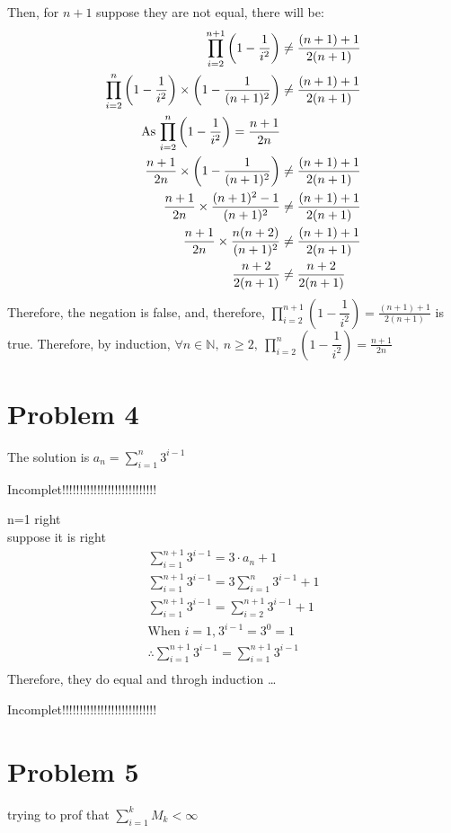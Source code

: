 \documentclass{article}
\begin{document}
    Then, for \(n+1\) suppose they are not equal, there will be:
    \begin{align*}
        \prod ^{n+1}_{i=2}\left(1-\dfrac{1}{i^2}\right)&\neq \frac{(n+1)+1}{2(n+1)}\\
        \prod ^{n}_{i=2}\left(1-\dfrac{1}{i^2}\right)\times \left(1-\frac{1}{(n+1)^2}\right)&\neq \frac{(n+1)+1}{2(n+1)}\\
        \text{As  \( \prod ^n_{i=2}\left(1-\dfrac{1}{i^2}\right)=\frac{n+1}{2n}\)}\\
        \frac{n+1}{2n} \times \left(1-\frac{1}{(n+1)^2}\right)&\neq \frac{(n+1)+1}{2(n+1)}\\
        \frac{n+1}{2n}\times \frac{(n+1)^2-1}{(n+1)^2}&\neq \frac{(n+1)+1}{2(n+1)}\\
        \frac{n+1}{2n}\times \frac{n(n+2)}{(n+1)^2}&\neq \frac{(n+1)+1}{2(n+1)}\\
        \frac{n+2}{2(n+1)} &\neq \frac{n+2}{2(n+1)}
    \end{align*}    
    Therefore, the negation is false, and, therefore, \(\displaystyle{\prod ^{n+1}_{i=2}\left(1-\dfrac{1}{i^2}\right) = \frac{(n+1)+1}{2(n+1)}}\) is true.
    Therefore, by induction, \(\forall n\in \mathbb{N},\ n\geqslant2,\ \displaystyle {\prod ^n_{i=2}\left(1-\dfrac{1}{i^2}\right)=\frac{n+1}{2n}}\)
\section*{Problem 4}
    The solution is \(\displaystyle{a_n =\sum ^{n}_{i=1} 3^{i-1}}\)

    Incomplet!!!!!!!!!!!!!!!!!!!!!!!!!!!

        n=1 right\\
        suppose it is right
    \begin{align*}
        \sum^{n+1}_{i=1} 3^{i-1}=3\cdot a_n +1\\
        \sum^{n+1}_{i=1} 3^{i-1}=3\sum^{n}_{i=1} 3^{i-1}+1\\
        \sum^{n+1}_{i=1} 3^{i-1}=\sum^{n+1}_{i=2} 3^{i-1}+1\\
        \text{When } i =1\text{,} \   3^{i-1}=3^0=1\\
        \therefore \sum^{n+1}_{i=1} 3^{i-1}=\sum^{n+1}_{i=1} 3^{i-1}\\
    \end{align*}
        Therefore, they do equal and throgh induction \dots
        





    Incomplet!!!!!!!!!!!!!!!!!!!!!!!!!!!
\section*{Problem 5}
    trying to prof that \(\displaystyle{\sum^k_{i=1}M_k<\infty}\)
\end{document}
